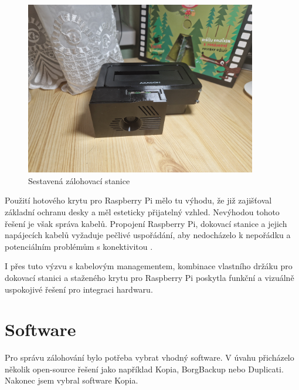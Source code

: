 \documentclass[a4paper,12pt, oneside]{book}
\begin{document}
\begin{figure}[h]
\centering
\includegraphics[width=0.9\textwidth]{img/skladani4.jpg}
\caption{Sestavená zálohovací stanice}
\end{figure}

Použití hotového krytu pro Raspberry Pi mělo tu výhodu, že již zajišťoval
základní ochranu desky a měl esteticky přijatelný vzhled. Nevýhodou tohoto
řešení je však správa kabelů. Propojení Raspberry Pi, dokovací stanice a jejich
napájecích kabelů vyžaduje pečlivé uspořádání, aby nedocházelo k nepořádku a
potenciálním problémům s konektivitou . 

I přes tuto výzvu s kabelovým managementem, kombinace vlastního
držáku pro dokovací stanici a staženého krytu pro Raspberry Pi poskytla funkční
a vizuálně uspokojivé řešení pro integraci hardwaru.



\chapter{Software}

Pro správu zálohování bylo potřeba vybrat vhodný software. 
V úvahu přicházelo několik open-source řešení jako například 
Kopia, BorgBackup nebo Duplicati. Nakonec jsem vybral software 
Kopia. 
\end{document}
